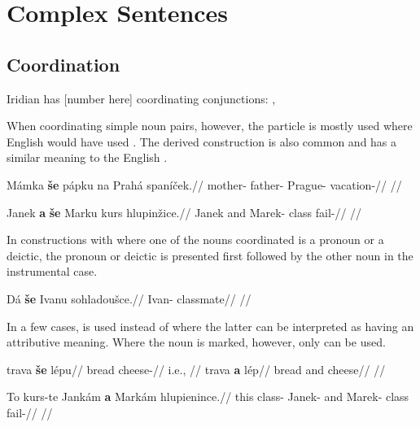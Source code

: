 \chapter{Complex Sentences}

\section{Coordination} 

Iridian has [number here] coordinating conjunctions: ,

When coordinating simple noun pairs, however, the particle  is mostly used where English would have used . The derived construction  is also common and has a similar meaning to the English .

\pex
\begingl
    \gla Mámka \textbf{še} pápku na Prahá spaníček.//
    \glb mother-  father-  Prague- vacation-//
    \glft {}//
\endgl
\xe

\pex
\begingl
    \gla Janek \textbf{a} \textbf{še} Marku kurs hlupinžice.//
    \glb Janek and  Marek- class fail-//
    \glft {}//
\endgl
\xe

In constructions with  where one of the nouns coordinated is a pronoun or a deictic, the pronoun or deictic is presented first followed by the other noun in the instrumental case.

\pex
\begingl
    \gla Dá \textbf{še} Ivanu sohladoušce.//
    \glb {}  Ivan- classmate//
    \glft {}//
\endgl
\xe

In a few cases,  is used instead of  where the latter can be interpreted as having an attributive meaning. Where the noun is marked, however, only  can be used.

\pex
\a
\begingl
    \gla trava \textbf{še} lépu//
    \glb bread  cheese-//
    \glft {} i.e., //
\endgl
\a
\begingl
    \gla trava \textbf{a} lép//
    \glb bread and cheese//
    \glft {}//
\endgl
\xe

\pex
\begingl
    \gla To kurs-te Jankám \textbf{a} Markám hlupienince.//
    \glb this class- Janek- and Marek- class fail-//
    \glft {}//
\endgl
\xe


